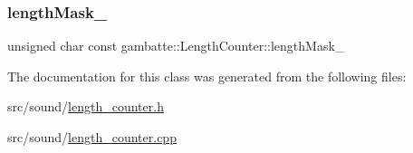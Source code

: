 \mbox{\label{classgambatte_1_1LengthCounter_a48c36b01e764cde4ff589c1618422475}} 
\subsubsection{\texorpdfstring{length\+Mask\+\_\+}{lengthMask\_}}
{\footnotesize\ttfamily unsigned char const gambatte\+::\+Length\+Counter\+::length\+Mask\+\_\+\hspace{0.3cm}{\ttfamily [private]}}



The documentation for this class was generated from the following files\+:\begin{DoxyCompactItemize}
\item 
src/sound/\hyperlink{length__counter_8h}{length\+\_\+counter.\+h}\item 
src/sound/\hyperlink{length__counter_8cpp}{length\+\_\+counter.\+cpp}\end{DoxyCompactItemize}
